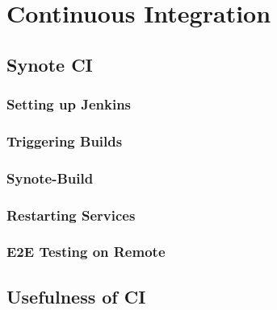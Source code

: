 \chapter{Continuous Integration}
\label{chap:continuous-integration}

\section{Synote CI}
\label{sec:synote-ci}

\subsection{Setting up Jenkins}
\label{subsec:setting-up-jenkins}

\subsection{Triggering Builds}
\label{subsec:triggering-builds}

\subsection{Synote-Build}
\label{subsec:synote-build}

\subsection{Restarting Services}
\label{subsec:restarting-services}

\subsection{E2E Testing on Remote}
\label{subsec:e2e-testing-on-remote}

\section{Usefulness of CI}
\label{sec:usefulness-of-ci}